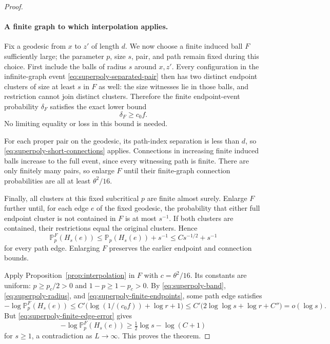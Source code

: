 \documentclass[11pt]{article}
\theoremstyle{definition}
\newcommand{\PP}{\mathbb P}
\newcommand{\pc}{p_c}
\begin{document}
\begin{proof}
\paragraph{A finite graph to which interpolation applies.}
Fix a geodesic from $x$ to $z'$ of length $d$. We now choose a finite
induced ball $F$ sufficiently large; the parameter $p$, size $s$,
pair, and path remain fixed during this choice.
First include the balls of radius $s$ around $x,z'$. Every configuration
in the infinite-graph event \eqref{eq:superpoly-separated-pair} then
has two distinct endpoint clusters of size at least $s$ in $F$ as
well: the size witnesses lie in those balls, and restriction cannot
join distinct clusters. Therefore the finite endpoint-event probability
$\delta_F$ satisfies the exact lower bound
\begin{equation}\label{eq:superpoly-finite-endpoints}
 \delta_F\ge c_0f.
\end{equation}
No limiting equality or loss in this bound is needed.

For each proper pair on the geodesic, its path-index separation is
less than $d$, so \eqref{eq:superpoly-short-connections} applies.
Connections in increasing finite induced balls increase to the full
event, since every witnessing path is finite. There are only finitely
many pairs, so enlarge $F$ until their finite-graph connection
probabilities are all at least $\theta^2/16$.

Finally, all clusters at this fixed subcritical $p$ are finite almost
surely. Enlarge $F$ further until, for each edge $e$ of the fixed
geodesic, the probability that either full endpoint cluster is not
contained in $F$ is at most $s^{-1}$. If both clusters are contained,
their restrictions equal the original clusters. Hence
\begin{equation}\label{eq:superpoly-finite-edge-error}
 \PP_p^F(H_s(e))
 \le\PP_p(H_s(e))+s^{-1}
 \le Cs^{-1/2}+s^{-1}
\end{equation}
for every path edge. Enlarging $F$ preserves the earlier endpoint
and connection bounds.

Apply Proposition~\ref{prop:interpolation} in $F$ with
$c=\theta^2/16$. Its constants are uniform: $p\ge\pc/2>0$ and
$1-p\ge1-\pc>0$. By \eqref{eq:superpoly-band},
\eqref{eq:superpoly-radius}, and
\eqref{eq:superpoly-finite-endpoints}, some path edge satisfies
\[
 -\log\PP_p^F(H_s(e))
 \le C'\bigl(\log(1/(c_0f))+\log r+1\bigr)
 \le C'\bigl(2\log\log s+\log r+C''\bigr)
 =o(\log s).
\]
But \eqref{eq:superpoly-finite-edge-error} gives
\[
 -\log\PP_p^F(H_s(e))
 \ge\tfrac12\log s-\log(C+1)
\]
for $s\ge1$, a contradiction as $L\to\infty$.
This proves the theorem.
\end{proof}
\end{document}
